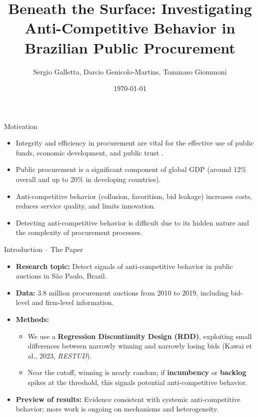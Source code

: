 \documentclass[aspectratio=169]{beamer}
\title[Beneath the Surface - LACEA]{\textbf{Beneath the Surface: Investigating Anti-Competitive Behavior in Brazilian Public Procurement}}
\author[Galletta, Genicolo-Martins, Giommoni]{Sergio Galletta, Darcio Genicolo-Martins, Tommaso Giommoni}
\institute[]{ETH Zürich \and Insper \and University of Amsterdam}
\date{\today}
\begin{document}
\begin{frame}
  \titlepage
\end{frame}


\begin{frame}{Motivation}
  \begin{itemize}
    \item Integrity and efficiency in procurement are vital for the effective use of public funds, economic development, and public trust \cite{BosioEtAl2022}.
    \item Public procurement is a significant component of global GDP (around 12\% overall and up to 20\% in developing countries).
    \item Anti-competitive behavior (collusion, favoritism, bid leakage) increases costs, reduces service quality, and limits innovation.
    \item Detecting anti-competitive behavior is difficult due to its hidden nature and the complexity of procurement processes.
  \end{itemize}
\end{frame}

\begin{frame}{Introduction -- The Paper}
\begin{itemize}
  \item \textbf{Research topic:} Detect signals of anti-competitive behavior in public auctions in S\~{a}o Paulo, Brazil. \pause
  \item \textbf{Data:} 3.8 million procurement auctions from 2010 to 2019, including bid-level and firm-level information. \pause
  \item \textbf{Methods:}
    \begin{itemize}
      \item We use a \textbf{Regression Discontinuity Design (RDD)}, exploiting small differences between narrowly winning and narrowly losing bids (Kawai et al., 2023, \emph{RESTUD}).
      \item Near the cutoff, winning is nearly random; if \textbf{incumbency} or \textbf{backlog} spikes at the threshold, this signals potential anti-competitive behavior.
    \end{itemize} \pause
  \item \textbf{Preview of results:} Evidence consistent with systemic anti-competitive behavior; more work is ongoing on mechanisms and heterogeneity.
\end{itemize}
\end{frame}
\end{document}
